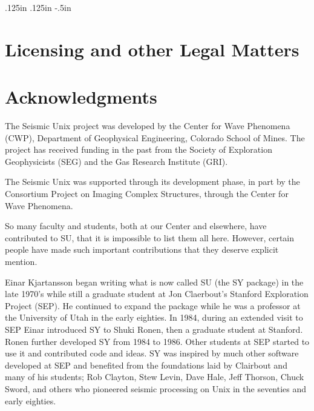 
\textwidth 6.25in
\textheight 8.75in
\oddsidemargin .125in
\evensidemargin .125in
\topmargin -.5in

\def\releasenumber{44RXX}
\def\currentyear{2019}
\def\website{wiki.Seismic-Unix.org}
\newtheorem{question}{Question}
\newtheorem{answer}{Answer}
\newenvironment{rmans}{\begin{answer} \em}{\end{answer}}





\tableofcontents
\newpage
\chapter*{Licensing and other Legal Matters}


\chapter*{Acknowledgments}

The Seismic Unix project was developed by the Center for Wave Phenomena (CWP), 
Department of Geophysical Engineering, Colorado School of Mines.  
The project has received funding in the past  from the Society of 
Exploration Geophysicists (SEG) and the Gas Research Institute (GRI).

The Seismic Unix was supported through its development phase, in part by
the Consortium Project on Imaging Complex Structures, through the Center
for Wave Phenomena.

So many faculty and students, both at our Center and elsewhere, have
contributed to SU, that it is impossible to list them all here.
However, certain people have made such important contributions that they
deserve explicit mention.

Einar Kjartansson began writing what is now called SU
(the SY package) in the late 1970's while still a graduate student
at Jon Claerbout's Stanford Exploration Project (SEP). He continued 
to expand the package while he was a professor at the University of 
Utah in the early eighties.  In 1984, during an extended visit to SEP
Einar introduced SY to Shuki Ronen, then a graduate student at Stanford.
Ronen further developed SY from 1984 to 1986.   Other students at SEP
started to use it and contributed code and ideas.  SY was inspired by much
other software developed at SEP and benefited from the foundations laid by
Clairbout and many of his students; Rob Clayton, Stew Levin, Dave Hale, Jeff
Thorson, Chuck Sword, and others who pioneered seismic processing on Unix
in the seventies and early eighties.  

